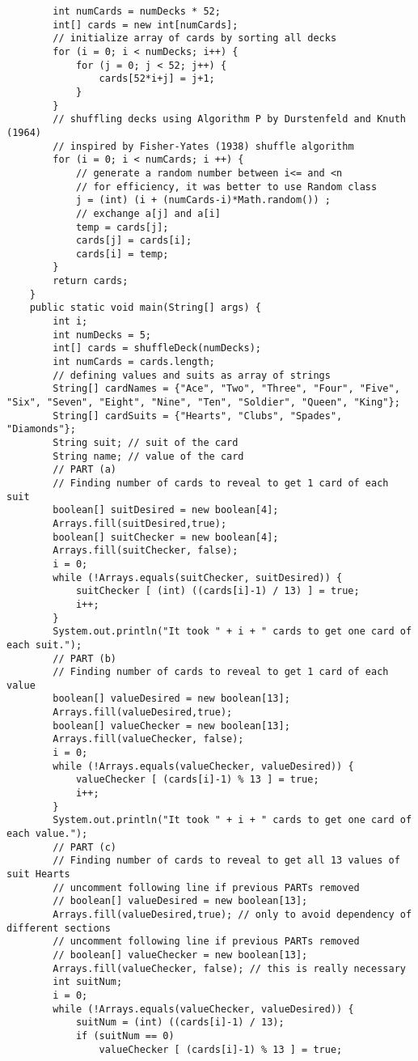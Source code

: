 \documentclass[12pt,letterpaper,twoside]{article}
\begin{document}
\begin{enumerate}
\begin{lstlisting}
		int numCards = numDecks * 52;
		int[] cards = new int[numCards];
		// initialize array of cards by sorting all decks
		for (i = 0; i < numDecks; i++) {
			for (j = 0; j < 52; j++) {
				cards[52*i+j] = j+1;
			}
		}
		// shuffling decks using Algorithm P by Durstenfeld and Knuth (1964)
		// inspired by Fisher-Yates (1938) shuffle algorithm
		for (i = 0; i < numCards; i ++) {
			// generate a random number between i<= and <n
			// for efficiency, it was better to use Random class
			j = (int) (i + (numCards-i)*Math.random()) ;
			// exchange a[j] and a[i]
			temp = cards[j];
			cards[j] = cards[i];
			cards[i] = temp;
		}
		return cards;
	}
	public static void main(String[] args) {
		int i;
		int numDecks = 5;
		int[] cards = shuffleDeck(numDecks);
		int numCards = cards.length;
		// defining values and suits as array of strings
		String[] cardNames = {"Ace", "Two", "Three", "Four", "Five", "Six", "Seven", "Eight", "Nine", "Ten", "Soldier", "Queen", "King"};
		String[] cardSuits = {"Hearts", "Clubs", "Spades", "Diamonds"};
		String suit; // suit of the card
		String name; // value of the card
		// PART (a)
		// Finding number of cards to reveal to get 1 card of each suit
		boolean[] suitDesired = new boolean[4];
		Arrays.fill(suitDesired,true);
		boolean[] suitChecker = new boolean[4];
		Arrays.fill(suitChecker, false);
		i = 0;
		while (!Arrays.equals(suitChecker, suitDesired)) {
			suitChecker [ (int) ((cards[i]-1) / 13) ] = true;
			i++;
		}
		System.out.println("It took " + i + " cards to get one card of each suit.");
		// PART (b)
		// Finding number of cards to reveal to get 1 card of each value
		boolean[] valueDesired = new boolean[13];
		Arrays.fill(valueDesired,true);
		boolean[] valueChecker = new boolean[13];
		Arrays.fill(valueChecker, false);
		i = 0;
		while (!Arrays.equals(valueChecker, valueDesired)) {
			valueChecker [ (cards[i]-1) % 13 ] = true;
			i++;
		}
		System.out.println("It took " + i + " cards to get one card of each value.");
		// PART (c)
		// Finding number of cards to reveal to get all 13 values of suit Hearts
		// uncomment following line if previous PARTs removed
		// boolean[] valueDesired = new boolean[13];
		Arrays.fill(valueDesired,true); // only to avoid dependency of different sections
		// uncomment following line if previous PARTs removed
		// boolean[] valueChecker = new boolean[13];
		Arrays.fill(valueChecker, false); // this is really necessary
		int suitNum;
		i = 0;
		while (!Arrays.equals(valueChecker, valueDesired)) {
			suitNum = (int) ((cards[i]-1) / 13);
			if (suitNum == 0)
				valueChecker [ (cards[i]-1) % 13 ] = true;

\end{lstlisting}
\end{enumerate}
\end{document}
